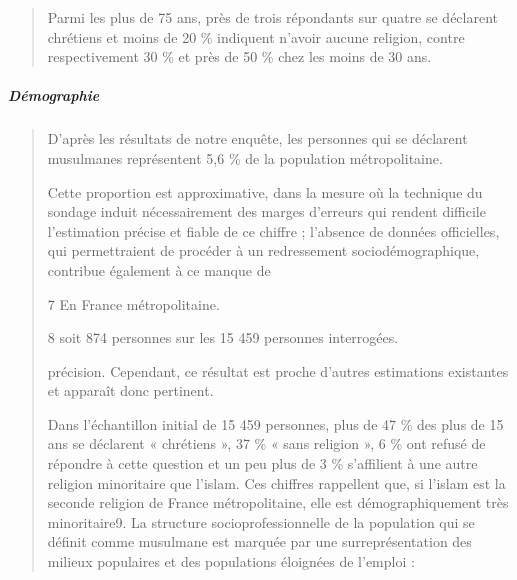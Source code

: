 \begin{quote}
Parmi les plus de 75 ans, près de trois répondants sur quatre se
déclarent chrétiens et moins de 20 \% indiquent n'avoir aucune religion,
contre respectivement 30 \% et près de 50 \% chez les moins de 30 ans.
\end{quote}

\hypertarget{duxe9mographie}{%
\subparagraph{Démographie}\label{duxe9mographie}}

\begin{quote}
D'après les résultats de notre enquête, les personnes qui se déclarent
musulmanes représentent 5,6 \% de la population métropolitaine.

Cette proportion est approximative, dans la mesure où la technique du
sondage induit nécessairement des marges d'erreurs qui rendent difficile
l'estimation précise et fiable de ce chiffre ; l'absence de données
officielles, qui permettraient de procéder à un redressement
sociodémographique, contribue également à ce manque de

7 En France métropolitaine.

8 soit 874 personnes sur les 15 459 personnes interrogées.



précision. Cependant, ce résultat est proche d'autres estimations
existantes et apparaît donc pertinent.

Dans l'échantillon initial de 15 459 personnes, plus de 47 \% des plus
de 15 ans se déclarent « chrétiens », 37 \% « sans religion », 6 \% ont
refusé de répondre à cette question et un peu plus de 3 \% s'affilient à
une autre religion minoritaire que l'islam. Ces chiffres rappellent que,
si l'islam est la seconde religion de France métropolitaine, elle est
démographiquement très minoritaire9. La structure socioprofessionnelle
de la population qui se définit comme musulmane est marquée par une
surreprésentation des milieux populaires et des populations éloignées de
l'emploi :
\end{quote}


